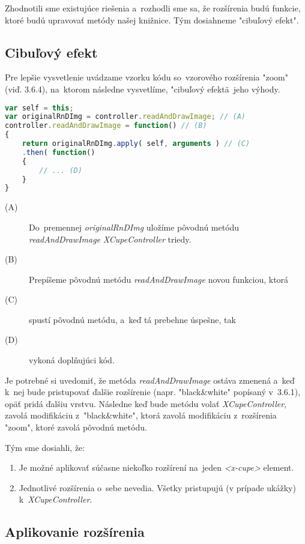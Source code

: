 Zhodnotili sme existujúce riešenia a~rozhodli sme sa, že rozšírenia budú funkcie, ktoré budú upravovať metódy našej knižnice. Tým dosiahneme "cibuľový efekt".

\subsection{Cibuľový efekt}

Pre lepšie vysvetlenie uvádzame vzorku kódu so~vzorového rozšírenia "zoom" (viď. 3.6.4), na~ktorom následne vysvetlíme, "cibuľový efekt\" a~jeho výhody.

\begin{lstlisting}[language=JavaScript]
var self = this;
var originalRnDImg = controller.readAndDrawImage; // (A)
controller.readAndDrawImage = function() // (B)
{
    return originalRnDImg.apply( self, arguments ) // (C)
    .then( function()
    {
        // ... (D)
    }
}
\end{lstlisting}

\begin{description}
	\item [(A)] Do~premennej \emph{originalRnDImg} uložíme pôvodnú metódu \emph{readAndDrawImage} \emph{XCupeController} triedy. 
	\item [(B)] Prepíšeme pôvodnú metódu \emph{readAndDrawImage} novou funkciou, ktorá
	\item [(C)] spustí pôvodnú metódu, a~keď tá prebehne úspešne, tak
	\item [(D)] vykoná doplňujúci kód.
\end{description}

Je potrebné si uvedomiť, že metóda \emph{readAndDrawImage} ostáva zmenená a~keď k~nej bude pristupovať ďalšie rozšírenie (napr. "black\&white" popísaný v~3.6.1), opäť pridá ďalšiu vrstvu. Následne keď bude metódu volať \emph{XCupeController}, zavolá modifikáciu z~"black\&white", ktorá zavolá modifikáciu z~rozšírenia "zoom", ktoré zavolá pôvodnú metódu.


Tým sme dosiahli, že:

\begin{enumerate}
	\item Je možné aplikovať súčasne niekoľko rozšírení na~jeden \emph{<x-cupe>} element.
	\item Jednotlivé rozšírenia o~sebe nevedia. Všetky pristupujú (v prípade ukážky) k~\emph{XCupeController}. 
\end{enumerate}


\subsection{Aplikovanie rozšírenia}

